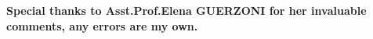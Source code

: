 \begin{multicols}{3}


${}$\\
\bf Special thanks to Asst.Prof.Elena GUERZONI for her invaluable comments, any errors are my own.

\end{multicols}
